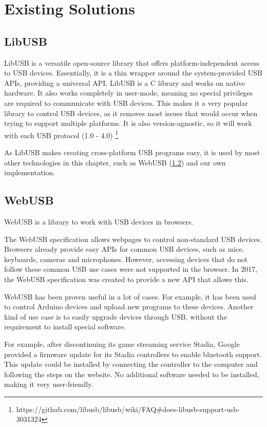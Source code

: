 \section{Existing Solutions}

\subsection{LibUSB}
LibUSB \cite{LibUSB} is a versatile open-source library that offers platform-independent access to USB devices. Essentially, it is a thin wrapper around the system-provided USB APIs, providing a universal API. LibUSB is a C library and works on native hardware. It also works completely in user-mode, meaning no special privileges are required to communicate with USB devices. This makes it a very popular library to control USB devices, as it removes most issues that would occur when trying to support multiple platforms. It is also version-agnostic, so it will work with each USB protocol (1.0 - 4.0) \footnote{https://github.com/libusb/libusb/wiki/FAQ\#does-libusb-support-usb-3031324}

As LibUSB makes creating cross-platform USB programs easy, it is used by most other technologies in this chapter, such as WebUSB (\ref{section:WebUSB}) and our own implementation.

\subsection{WebUSB}
\label{section:WebUSB}

WebUSB \cite{WebUSB} is a library to work with USB devices in browsers.

The WebUSB specification allows webpages to control non-standard USB devices. Browsers already provide easy APIs for common USB devices, such as mice, keyboards, cameras and microphones. However, accessing devices that do not follow these common USB use cases were not supported in the browser. In 2017, the WebUSB specification was created to provide a new API that allows this.

WebUSB has been proven useful in a lot of cases. For example, it has been used to control Arduino devices and upload new programs to these devices. Another kind of use case is to easily upgrade devices through USB, without the requirement to install special software. 

For example, after discontinuing its game streaming service Stadia, Google provided a firmware update for its Stadia controllers to enable bluetooth support. This update could be installed by connecting the controller to the computer and following the steps on the website. No additional software needed to be installed, making it very user-friendly.

